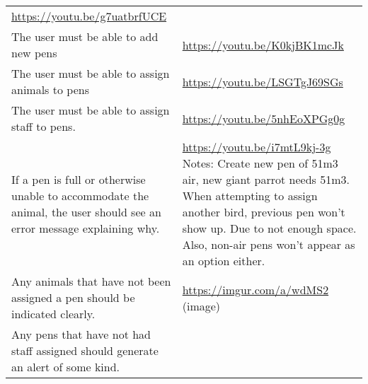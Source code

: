 \documentclass[english,a4paper,]{report}
\begin{document}
\begin{longtable}[]{@{}ll@{}}
\begin{minipage}[t]{0.47\columnwidth}
\url{https://youtu.be/g7uatbrfUCE}\strut
\end{minipage}\tabularnewline
\begin{minipage}[t]{0.47\columnwidth}\raggedright
The user must be able to add new pens\strut
\end{minipage} & \begin{minipage}[t]{0.47\columnwidth}\raggedright
\url{https://youtu.be/K0kjBK1mcJk}\strut
\end{minipage}\tabularnewline
\begin{minipage}[t]{0.47\columnwidth}\raggedright
The user must be able to assign animals to pens\strut
\end{minipage} & \begin{minipage}[t]{0.47\columnwidth}\raggedright
\url{https://youtu.be/LSGTgJ69SGs}\strut
\end{minipage}\tabularnewline
\begin{minipage}[t]{0.47\columnwidth}\raggedright
The user must be able to assign staff to pens.\strut
\end{minipage} & \begin{minipage}[t]{0.47\columnwidth}\raggedright
\url{https://youtu.be/5nhEoXPGg0g}\strut
\end{minipage}\tabularnewline
\begin{minipage}[t]{0.47\columnwidth}\raggedright
If a pen is full or otherwise unable to accommodate the animal, the user
should see an error message explaining why.\strut
\end{minipage} & \begin{minipage}[t]{0.47\columnwidth}\raggedright
\url{https://youtu.be/i7mtL9kj-3g} Notes: Create new pen of 51m3 air,
new giant parrot needs 51m3. When attempting to assign another bird,
previous pen won't show up. Due to not enough space. Also, non-air pens
won't appear as an option either.\strut
\end{minipage}\tabularnewline
\begin{minipage}[t]{0.47\columnwidth}\raggedright
Any animals that have not been assigned a pen should be indicated
clearly.\strut
\end{minipage} & \begin{minipage}[t]{0.47\columnwidth}\raggedright
\url{https://imgur.com/a/wdMS2} (image)\strut
\end{minipage}\tabularnewline
\begin{minipage}[t]{0.47\columnwidth}\raggedright
Any pens that have not had staff assigned should generate an alert of
some kind.\strut
\end{minipage} & \begin{minipage}[t]{0.47\columnwidth}\raggedright

\end{minipage}
\end{longtable}
\end{document}
